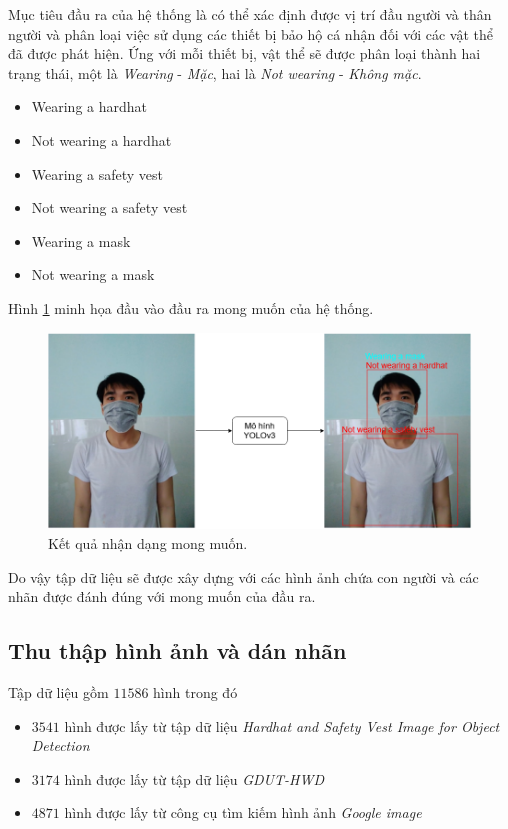 Mục tiêu đầu ra của hệ thống là có thể xác định được vị trí đầu người và thân người và phân loại việc sử dụng các thiết bị bảo hộ cá nhận đối với các vật thể đã được phát hiện. Ứng với mỗi thiết bị, vật thể sẽ được phân loại thành hai trạng thái, một là \emph{Wearing} - \emph{Mặc}, hai là \emph{Not wearing} - \emph{Không mặc}.
\begin{itemize}
	\item Wearing a hardhat
	\item Not wearing a hardhat
	\item Wearing a safety vest
	\item Not wearing a safety vest
	\item Wearing a mask
	\item Not wearing a mask
\end{itemize}
Hình \ref{fig:expected_output} minh họa đầu vào đầu ra mong muốn của hệ thống.
\begin{figure}[ht!]
	\centerline{\includegraphics[scale=0.4]{images/expected_output.png}}
  	\caption{Kết quả nhận dạng mong muốn.}
  	\label{fig:expected_output}
\end{figure}

Do vậy tập dữ liệu sẽ được xây dựng với các hình ảnh chứa con người và các nhãn được đánh đúng với mong muốn của đầu ra.
\subsection{Thu thập hình ảnh và dán nhãn}
Tập dữ liệu gồm $11586$ hình trong đó
\begin{itemize}
	\item $3541$ hình được lấy từ tập dữ liệu \emph{Hardhat and Safety Vest Image for Object Detection}\cite{john:2020:hardhat}
	\item $3174$ hình được lấy từ tập dữ liệu \emph{GDUT-HWD}\cite{jixiu:2019:automatic}
	\item $4871$ hình được lấy từ công cụ tìm kiếm hình ảnh \emph{Google image}
\end{itemize}

